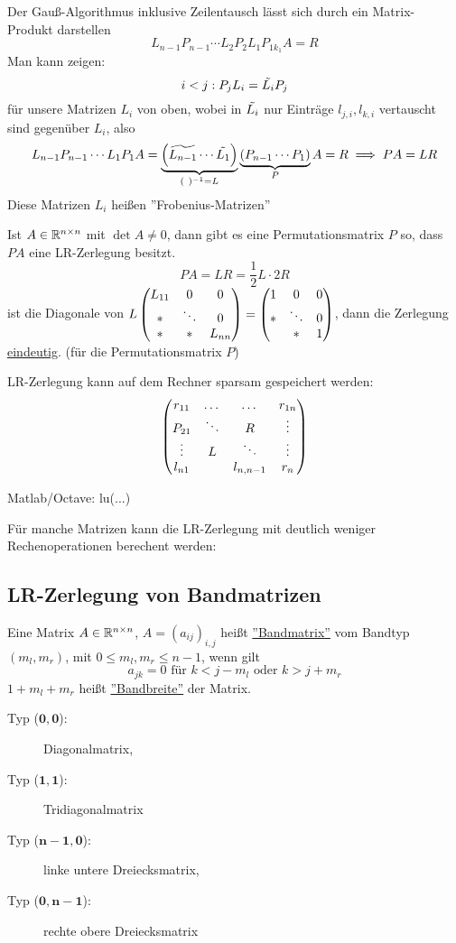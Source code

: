 \documentclass[../Skript.tex]{subfiles}
\begin{document}
Der Gauß-Algorithmus inklusive Zeilentausch lässt sich durch ein Matrix-
Produkt darstellen \[
    L_{n-1}P_{n-1}\cdots L_2 P_2 L_1 P_{1k_1}A  = R
\]
Man kann zeigen: \[
    i < j : P_jL_i = \Tilde{L_i}P_j
\]
für unsere Matrizen $L_i$ von oben, wobei in $\Tilde{L_i}$ nur Einträge 
$l_{j,i}, l_{k,i}$ vertauscht sind gegenüber $L_i$, also \[
    L_{n-1} P_{n-1} \cdots L_1P_1A = \underbrace{\left(\widetilde{L_{n-
    1}}\cdots \Tilde{L_1}\right)}_{(\ )^{-1} = L}\underbrace{\left(P_{n-
    1}\cdots P_1\right)}_{P} A  = R \implies PA = LR
\]
Diese Matrizen $L_i$ heißen ''Frobenius-Matrizen''
\begin{theorem}
    Ist $A\in\mathbb{R}^{n\times n}$ mit $\det A \neq 0$, dann gibt es eine 
    Permutationsmatrix $P$ so, dass $PA$ eine LR-Zerlegung besitzt.
    \[
    PA = LR = \frac{1}{2}L\cdot 2R
    \]
    ist die Diagonale von $L\begin{pmatrix}L_{11}& 0 & 0\\
                                   * & \ddots & 0\\
                                   * & * & L_{nn}\end{pmatrix} = \begin{pmatrix}1&0&0\\
                                   *&\ddots & 0\\* & * & 1\end{pmatrix}$, 
    dann die Zerlegung \underline{eindeutig}. (für die Permutationsmatrix 
    $P$)
\end{theorem}
\begin{remark}
    LR-Zerlegung kann auf dem Rechner sparsam gespeichert werden: \[
    \begin{pmatrix}r_{11} & \dots & \dots &r_{1n}\\P_{21} & \ddots & R & \vdots\\
    \vdots & L & \ddots & \vdots\\
    l_{n1} & & l_{n,n-1}&r_n\end{pmatrix}
    \]
\end{remark}
\begin{remark}
    Matlab/Octave: lu(...)
\end{remark}
Für manche  Matrizen kann die LR-Zerlegung mit deutlich weniger 
Rechenoperationen 
 berechent werden:
\subsection{LR-Zerlegung von Bandmatrizen}
\begin{definition}
    Eine Matrix $A\in \mathbb{R}^{n\times n}$, $A=(a_{ij})_{i,j}$ heißt 
    \underline{''Bandmatrix''}
    vom Bandtyp $(m_l,m_r)$, mit $0\leq m_l, m_r \leq n-1$, wenn gilt\[
        a_{jk} = 0 \text{ für } k < j-m_l \text{ oder }k > j+m_r\]
    $1+m_l+m_r$ heißt \underline{''Bandbreite''} der Matrix.
\end{definition}
\begin{example}\hfill
    \begin{description}
        \item[Typ ($\mathbf{0,0}$):] Diagonalmatrix,
        \item[Typ ($\mathbf{1,1}$):] Tridiagonalmatrix
        \item[Typ ($\mathbf{n-1,0}$):] linke untere Dreiecksmatrix,
        \item[Typ ($\mathbf{0,n-1}$):] rechte obere Dreiecksmatrix    
    \end{description}
\end{example}
\end{document}
